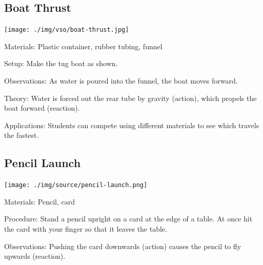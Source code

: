 \begin{multicols}{2}
\subsection{Boat Thrust}

\begin{center}
\texttt{[image: ./img/vso/boat-thrust.jpg]}
\end{center}

\begin{description*}
\item[Materials:]{Plastic container, rubber tubing, funnel}
\item[Setup:]{Make the tug boat as shown. }
\item[Observations:]{As water is poured into the funnel, the boat moves forward.}
\item[Theory:]{Water is forced out the rear tube by gravity (action), which propels the boat forward (reaction).}
\item[Applications:]{Students can compete using different materials to see which travels the fastest.}
\end{description*}

\subsection{Pencil Launch}

\begin{center}
\texttt{[image: ./img/source/pencil-launch.png]}
\end{center}

\begin{description*}
\item[Materials:]{Pencil, card}
\item[Procedure:]{Stand a pencil upright on a card at the edge of a table. At once hit the card with your finger so that it leaves the table.}
\item[Observations:]{Pushing the card downwards (action) causes the pencil to fly upwards (reaction).}
\end{description*}


\end{multicols}
